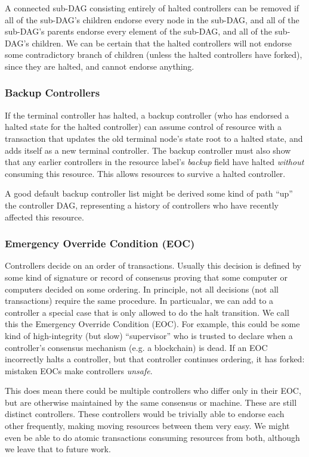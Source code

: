 \documentclass[a4paper,USenglish,cleveref, autoref, thm-restate, anonymous]{lipics-v2021}
\begin{document}
A connected sub-DAG consisting entirely of halted controllers can be removed if all of the sub-DAG's children endorse every node in the sub-DAG, and all of the sub-DAG's parents endorse every element of the sub-DAG, and all of the sub-DAG's children. 
We can be certain that the halted controllers will not endorse some contradictory branch of children (unless the halted controllers have forked), since they are halted, and cannot endorse anything. 

\subsubsection{Backup Controllers}
If the terminal controller has halted, a backup controller (who has endorsed a halted state for the halted controller) can assume control of  resource with a transaction that updates the old terminal node's state root to a halted state, and adds itself as a new terminal controller. 
The backup controller must also show that any earlier controllers in the resource label's \textit{backup} field have halted \textit{without} consuming this resource. 
This allows resources to survive a halted controller. 

A good default backup controller list might be derived some kind of path ``up'' the controller DAG, representing a history of controllers who have recently affected this resource. 

\subsubsection{Emergency Override Condition (EOC)}
Controllers decide on an order of transactions.
Usually this decision is defined by some kind of signature or record of consensus proving that some computer or computers decided on some ordering.
In principle, not all decisions (not all transactions) require the same procedure.
In particualar, we can add to a controller a special case that is only allowed to do the halt transition.
We call this the Emergency Override Condition (EOC). 
For example, this could be some kind of high-integrity (but slow) ``supervisor'' who is trusted to declare when a controller's consensus mechanism (e.g. a blockchain) is dead.
If an EOC incorrectly halts a controller, but that controller continues ordering, it has forked: mistaken EOCs make controllers \emph{unsafe}. 

This does mean there could be multiple controllers who differ only in their EOC, but are otherwise maintained by the same consensus or machine.
These are still distinct controllers.
These controllers would be trivially able to endorse each other frequently, making moving resources between them very easy. 
We might even be able to do atomic transactions consuming resources from both, although we leave that to future work. 
\end{document}
